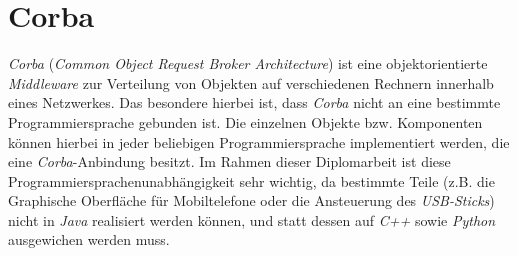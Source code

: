 \section{Corba}
    \emph{Corba} (\emph{Common Object Request Broker Architecture}) ist eine objektorientierte \emph{Middleware} 
    zur Verteilung von Objekten auf verschiedenen Rechnern innerhalb eines Netzwerkes. Das besondere hierbei ist, 
    dass \emph{Corba} nicht an eine bestimmte Programmiersprache gebunden ist. Die einzelnen Objekte bzw. Komponenten 
    können hierbei in jeder beliebigen Programmiersprache implementiert werden, die eine \emph{Corba}-Anbindung besitzt.
    \cite{Disos}
    Im Rahmen dieser Diplomarbeit ist diese Programmiersprachenunabhängigkeit sehr wichtig, da bestimmte
    Teile (z.B. die Graphische Oberfläche für Mobiltelefone oder die Ansteuerung des \emph{USB-Sticks}) nicht in 
    \emph{Java} realisiert werden können, und statt dessen auf \emph{C++} sowie \emph{Python} ausgewichen werden muss.
